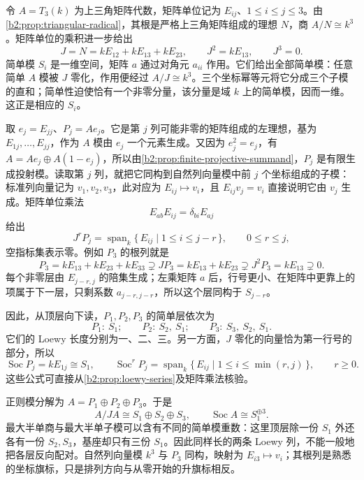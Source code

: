 令 \(A=T_3(k)\) 为上三角矩阵代数，矩阵单位记为 \(E_{ij}\)、\(1\le i\le j\le3\)。由\cref{b2:prop:triangular-radical}，其根是严格上三角矩阵组成的理想 \(N\)，商 \(A/N\cong k^3\)。矩阵单位的乘积进一步给出
\[
	J=N=kE_{12}+kE_{13}+kE_{23},\qquad J^2=kE_{13},\qquad J^3=0.
\]
简单模 \(S_i\) 是一维空间，矩阵 \(a\) 通过对角元 \(a_{ii}\) 作用。它们给出全部简单模：任意简单 \(A\) 模被 \(J\) 零化，作用便经过 \(A/J\cong k^3\)。三个坐标幂等元将它分成三个子模的直和；简单性迫使恰有一个非零分量，该分量是域 \(k\) 上的简单模，因而一维。这正是相应的 \(S_i\)。

\ProseParagraphBreak
取 \(e_j=E_{jj}\)、\(P_j=Ae_j\)。它是第 \(j\) 列可能非零的矩阵组成的左理想，基为 \(E_{1j},\ldots,E_{jj}\)，作为 \(A\) 模由 \(e_j\) 一个元素生成。又因为 \(e_j^2=e_j\)，有 \(A=Ae_j\oplus A(1-e_j)\)，所以由\cref{b2:prop:finite-projective-summand}，\(P_j\) 是有限生成投射模。读取第 \(j\) 列，就把它同构到自然列向量模中前 \(j\) 个坐标组成的子模：标准列向量记为 \(v_1,v_2,v_3\)，此对应为 \(E_{ij}\mapsto v_i\)，且 \(E_{ij}v_j=v_i\) 直接说明它由 \(v_j\) 生成。矩阵单位乘法
\[
	E_{ab}E_{ij}=\delta_{bi}E_{aj}
\]
给出
\begin{equation}\label{b2:eq:triangular-projective-layers}
	J^rP_j=\operatorname{span}_k\{\,E_{ij}\mid1\le i\le j-r\,\}, \qquad 0\le r\le j,
\end{equation}
空指标集表示零。例如 \(P_3\) 的根列就是
\[
	P_3=kE_{13}+kE_{23}+kE_{33} \supsetneq JP_3=kE_{13}+kE_{23} \supsetneq J^2P_3=kE_{13}\supsetneq0.
\]
每个非零层由 \(E_{j-r,j}\) 的陪集生成；左乘矩阵 \(a\) 后，行号更小、在矩阵中更靠上的项属于下一层，只剩系数 \(a_{j-r,j-r}\)，所以这个层同构于 \(S_{j-r}\)。

\ProseParagraphBreak
因此，从顶层向下读，\(P_1,P_2,P_3\) 的简单层依次为
\[
	P_1:\ S_1;\qquad P_2:\ S_2,\ S_1;\qquad P_3:\ S_3,\ S_2,\ S_1.
\]
它们的 Loewy 长度分别为一、二、三。另一方面，\(J\) 零化的向量恰为第一行号的部分，所以
\[
	\operatorname{Soc}P_j=kE_{1j}\cong S_1, \qquad \operatorname{Soc}^rP_j=\operatorname{span}_k\{\,E_{ij}\mid1\le i\le\min(r,j)\,\},\qquad r\ge0.
\]
这些公式可直接从\cref{b2:prop:loewy-series}及矩阵乘法核验。

\ProseParagraphBreak
正则模分解为 \(A=P_1\oplus P_2\oplus P_3\)。于是
\[
	A/JA\cong S_1\oplus S_2\oplus S_3, \qquad \operatorname{Soc}A\cong S_1^{\oplus3}.
\]
最大半单商与最大半单子模可以含有不同的简单模重数：这里顶层除一份 \(S_1\) 外还各有一份 \(S_2,S_3\)，基座却只有三份 \(S_1\)。因此同样长的两条 Loewy 列，不能一般地把各层反向配对。自然列向量模 \(k^3\) 与 \(P_3\) 同构，映射为 \(E_{i3}\mapsto v_i\)；其根列是熟悉的坐标旗标，只是排列方向与从零开始的升旗标相反。

